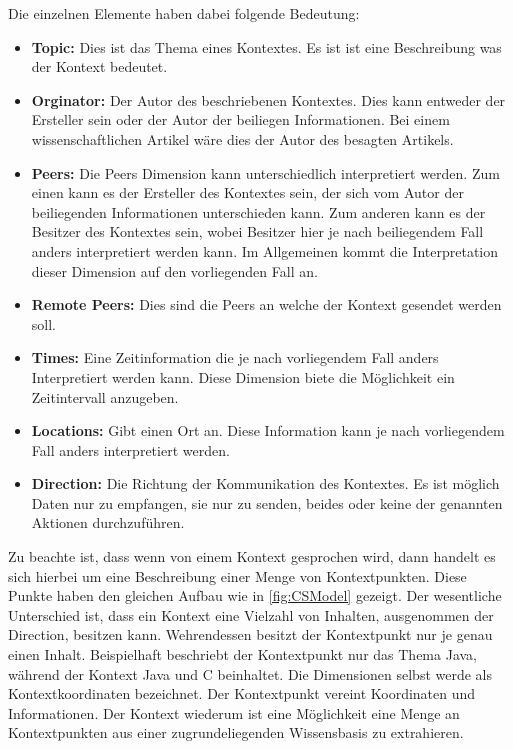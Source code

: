 \documentclass[a4paper]{article}
\begin{document}
	Die einzelnen Elemente haben dabei folgende Bedeutung:
	\begin{itemize}
		\item \textbf{Topic:} Dies ist das Thema eines Kontextes. Es ist ist eine
		Beschreibung was der Kontext bedeutet.
		\item \textbf{Orginator:} Der Autor des beschriebenen Kontextes. Dies
		kann entweder der Ersteller sein oder der Autor der beiliegen
		Informationen. Bei einem wissenschaftlichen Artikel wäre dies der Autor
		des besagten Artikels.
		\item \textbf{Peers:} Die Peers Dimension kann unterschiedlich interpretiert
		werden.	Zum einen kann es der Ersteller des Kontextes sein, der sich vom
		Autor der beiliegenden Informationen unterschieden kann. Zum anderen kann es
		der Besitzer des Kontextes sein, wobei Besitzer hier je nach 
		beiliegendem Fall anders interpretiert werden kann. Im Allgemeinen
		kommt die Interpretation dieser Dimension auf den vorliegenden Fall an.
		\newpage
		\item \textbf{Remote Peers:} Dies sind die Peers an welche der Kontext
		gesendet werden soll.
		\item \textbf{Times:} Eine Zeitinformation die je nach vorliegendem Fall
		anders Interpretiert werden kann. Diese Dimension biete die Möglichkeit
		ein Zeitintervall anzugeben.
		\item \textbf{Locations:} Gibt einen Ort an. Diese Information kann je
		nach vorliegendem Fall anders interpretiert werden.
		\item \textbf{Direction:} Die Richtung der Kommunikation des Kontextes.
		Es ist möglich Daten nur zu empfangen, sie nur zu senden, beides oder keine
		der genannten Aktionen durchzuführen.
	\end{itemize} 	
	
	Zu beachte ist, dass wenn von einem Kontext gesprochen wird, dann handelt es
	sich hierbei um eine Beschreibung einer Menge von Kontextpunkten. Diese
	Punkte haben den gleichen Aufbau wie in \autoref{fig:CSModel} gezeigt. Der 
	wesentliche Unterschied ist, dass ein Kontext eine Vielzahl von Inhalten,
	ausgenommen der Direction, besitzen kann. Wehrendessen besitzt der
	Kontextpunkt nur je genau einen Inhalt. Beispielhaft beschriebt der
	Kontextpunkt nur das Thema Java, während der Kontext Java und C beinhaltet.
	Die Dimensionen selbst werde als Kontextkoordinaten bezeichnet. Der 
	Kontextpunkt vereint Koordinaten und Informationen. Der Kontext wiederum
	ist eine Möglichkeit eine Menge an Kontextpunkten aus einer zugrundeliegenden
	Wissensbasis zu extrahieren.
	
\end{document}
